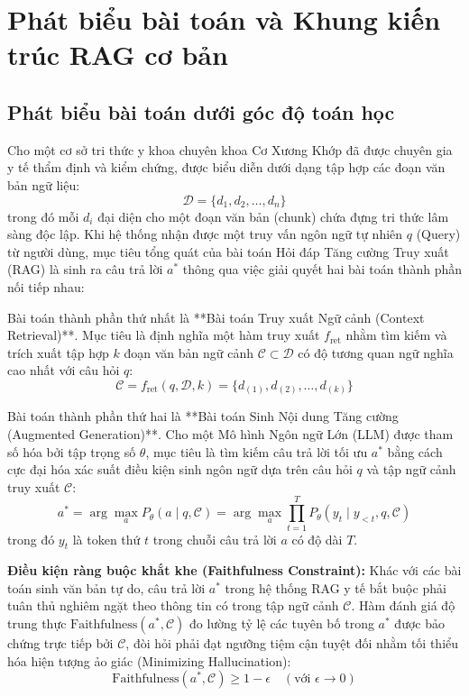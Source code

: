 \section{Phát biểu bài toán và Khung kiến trúc RAG cơ bản}

\subsection{Phát biểu bài toán dưới góc độ toán học}
Cho một cơ sở tri thức y khoa chuyên khoa Cơ Xương Khớp đã được chuyên gia y tế thẩm định và kiểm chứng, được biểu diễn dưới dạng tập hợp các đoạn văn bản ngữ liệu:
\[
    \mathcal{D} = \{d_1, d_2, \dots, d_n\}
\]
trong đó mỗi $d_i$ đại diện cho một đoạn văn bản (chunk) chứa đựng tri thức lâm sàng độc lập. Khi hệ thống nhận được một truy vấn ngôn ngữ tự nhiên $q$ (Query) từ người dùng, mục tiêu tổng quát của bài toán Hỏi đáp Tăng cường Truy xuất (RAG) là sinh ra câu trả lời $a^*$ thông qua việc giải quyết hai bài toán thành phần nối tiếp nhau:

Bài toán thành phần thứ nhất là **Bài toán Truy xuất Ngữ cảnh (Context Retrieval)**. Mục tiêu là định nghĩa một hàm truy xuất $f_{\text{ret}}$ nhằm tìm kiếm và trích xuất tập hợp $k$ đoạn văn bản ngữ cảnh $\mathcal{C} \subset \mathcal{D}$ có độ tương quan ngữ nghĩa cao nhất với câu hỏi $q$:
\[
    \mathcal{C} = f_{\text{ret}}(q, \mathcal{D}, k) = \{d_{(1)}, d_{(2)}, \dots, d_{(k)}\}
\]

Bài toán thành phần thứ hai là **Bài toán Sinh Nội dung Tăng cường (Augmented Generation)**. Cho một Mô hình Ngôn ngữ Lớn (LLM) được tham số hóa bởi tập trọng số $\theta$, mục tiêu là tìm kiếm câu trả lời tối ưu $a^*$ bằng cách cực đại hóa xác suất điều kiện sinh ngôn ngữ dựa trên câu hỏi $q$ và tập ngữ cảnh truy xuất $\mathcal{C}$:
\[
    a^* = \arg\max_{a} P_{\theta}(a \mid q, \mathcal{C}) = \arg\max_{a} \prod_{t=1}^{T} P_{\theta}(y_t \mid y_{<t}, q, \mathcal{C})
\]
trong đó $y_t$ là token thứ $t$ trong chuỗi câu trả lời $a$ có độ dài $T$.

\textbf{Điều kiện ràng buộc khắt khe (Faithfulness Constraint):}
Khác với các bài toán sinh văn bản tự do, câu trả lời $a^*$ trong hệ thống RAG y tế bắt buộc phải tuân thủ nghiêm ngặt theo thông tin có trong tập ngữ cảnh $\mathcal{C}$. Hàm đánh giá độ trung thực $\text{Faithfulness}(a^*, \mathcal{C})$ đo lường tỷ lệ các tuyên bố trong $a^*$ được bảo chứng trực tiếp bởi $\mathcal{C}$, đòi hỏi phải đạt ngưỡng tiệm cận tuyệt đối nhằm tối thiểu hóa hiện tượng ảo giác (Minimizing Hallucination):
\[
    \text{Faithfulness}(a^*, \mathcal{C}) \ge 1 - \epsilon \quad (\text{với } \epsilon \to 0)
\]


